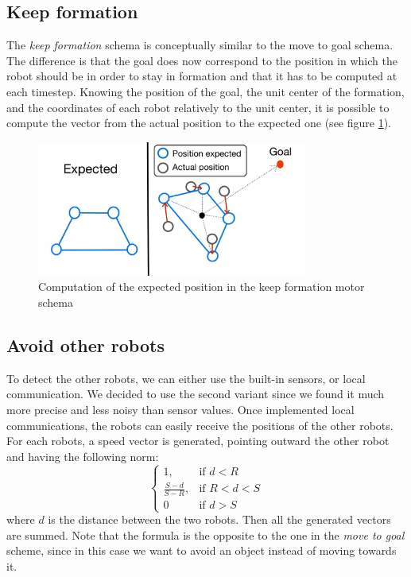 \documentclass[journal]{IEEEtran}
\begin{document}
\subsection{Keep formation}
The \textit{keep formation} schema is conceptually similar to the move
to goal schema. The difference is that the goal does now correspond to the position in which 
the robot should be in order to stay in formation and that it has to be computed at each 
timestep. Knowing the position of the goal, the unit center of the formation, and the 
coordinates of each robot relatively to the unit center, it is possible to compute the vector 
from the actual position to the expected one (see figure \ref{img:keep_formation}). 
\begin{figure}[!t]
\centering
\includegraphics[width=3.5in]{Images/keep_formation.jpg}
\caption{Computation of the expected position in the keep formation motor schema}
\label{img:keep_formation}
\end{figure}

\subsection{Avoid other robots}
To detect the other robots, we can either use the built-in sensors, or local communication. We decided to use the second variant since we found it much more precise and less noisy than sensor values. Once implemented local communications, the robots can easily receive the
positions of the other robots. For each robots, a speed vector is generated, pointing outward the other robot and having the following norm:
\begin{equation}
\begin{cases} 1, & \mbox{if }  d<R \\ \frac{S-d}{S-R}, & \mbox{if }
  R<d<S \\ 0 & \mbox{if } d>S\end{cases}
\end{equation}
where $d$ is the distance between the two robots. Then all the generated vectors
are summed. Note that the formula is the opposite to the one in the
\textit{move to goal} scheme, since in this case we want to avoid an object
instead of moving towards it.
\end{document}
